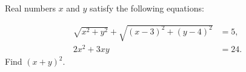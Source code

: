 Real numbers $x$ and $y$ satisfy the following equations:

\begin{align*}
\sqrt{x^2+y^2}+\sqrt{(x-3)^2+(y-4)^2}&=5,\\
2x^2+3xy&=24.
\end{align*}Find $(x+y)^2$.
